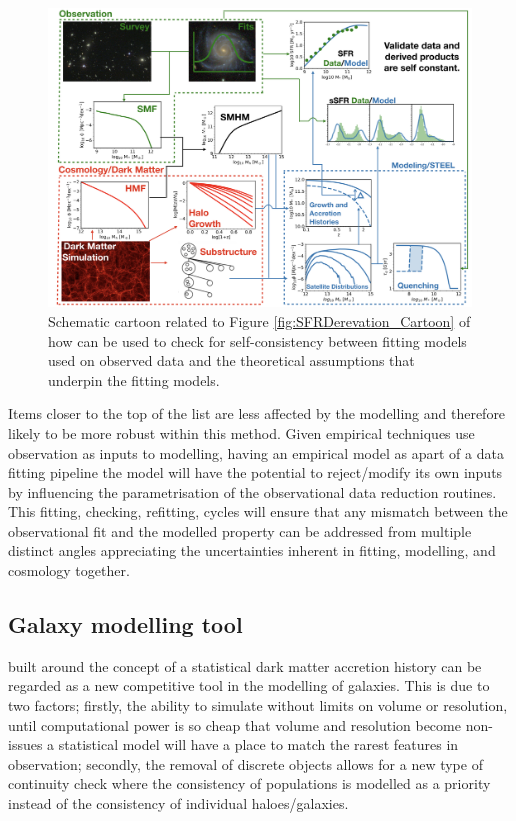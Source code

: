 \begin{figure}[t]
    \centering
    \includegraphics[width = \linewidth]{Figures/Chapter6/FullModelCartoon.png}
    \caption{Schematic cartoon related to Figure \ref{fig:SFRDerevation_Cartoon} of how \steel can be used to check for self-consistency between fitting models used on observed data and the theoretical assumptions that underpin the fitting models.}
    \label{fig:Full_Mod_Toon}
\end{figure}
Items closer to the top of the list are less affected by the modelling and therefore likely to be more robust within this method. Given empirical techniques use observation as inputs to modelling, having an empirical model as apart of a data fitting pipeline the model will have the potential to reject/modify its own inputs by influencing the parametrisation of the observational data reduction routines. This fitting, checking, refitting, cycles will ensure that any mismatch between the observational fit and the modelled property can be addressed from multiple distinct angles appreciating the uncertainties inherent in fitting, modelling, and cosmology together.

\subsection{Galaxy modelling tool}

\steel built around the concept of a statistical dark matter accretion history can be regarded as a new competitive tool in the modelling of galaxies. This is due to two factors; firstly, the ability to simulate without limits on volume or resolution, until computational power is so cheap that volume and resolution become non-issues a statistical model will have a place to match the rarest features in observation; secondly, the removal of discrete objects allows for a new type of continuity check where the consistency of populations is modelled as a priority instead of the consistency of individual haloes/galaxies. 

